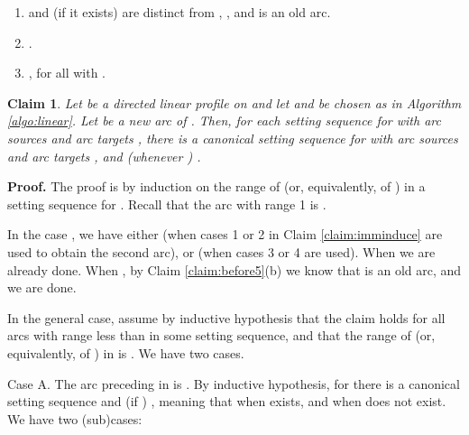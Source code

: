 \documentclass{article}
\newtheorem{fait}{Claim}
\newcommand{\bfn}{\begin{fait}}
\newcommand{\efn}{\end{fait}}
\begin{document}
\begin{enumerate}
\item[]  and (if it exists)  are distinct from , , and  is an old arc.
\item[] .  
\item[] , for all  with . 
\end{enumerate} 

\bfn
Let  be a directed linear profile on   and
let   and  be chosen as in  Algorithm \ref{algo:linear}. 
Let  be a new arc of .  Then, for each setting sequence  for  with
arc sources  and arc targets ,
there is a canonical setting sequence  for  with arc sources 
 and arc targets , and (whenever ) 
. 
\label{claim:shortpath}
\efn

{\bf Proof.} The proof is by induction on the range  of  (or, equivalently, of
) in a setting sequence  for . Recall that the arc with range 1 
is .

In the case , we have either  (when cases 1 or 2 in Claim 
\ref{claim:imminduce} are used to obtain the second arc), or  (when cases 3 or 4 
are used).  When  we are already done. When , by Claim \ref{claim:before5}(b)
we know that  is an old arc, and we are done.

In the general case, assume by inductive hypothesis that the claim holds for all
arcs with range less than  in some setting sequence, and that the range of  
(or, equivalently, of ) in  is .  We have two cases.

Case A. The arc preceding  in  is . By inductive hypothesis, for
 there is a canonical setting sequence  and 
(if ) , meaning that  when 
exists, and  when  does not exist. We have two (sub)cases:
\end{document}
